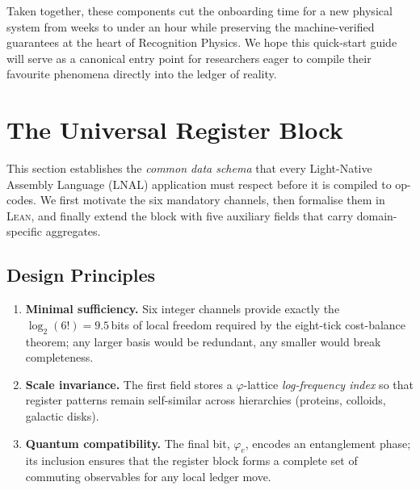 \documentclass[11pt,a4paper]{article}
\begin{document}
Taken together, these components cut the onboarding time for a new physical system from weeks to under an hour while preserving the machine-verified guarantees at the heart of Recognition Physics.  We hope this quick-start guide will serve as a canonical entry point for researchers eager to compile their favourite phenomena directly into the ledger of reality.

\section{The Universal Register Block}
\label{sec:register-block}

\noindent
This section establishes the \emph{common data schema} that every
Light-Native Assembly Language (LNAL) application must respect before it
is compiled to op-codes.  We first motivate the six mandatory channels,
then formalise them in \textsc{Lean}, and finally extend the block with
five auxiliary fields that carry domain-specific aggregates.

\subsection{Design Principles}
\label{subsec:design-principles}

\begin{enumerate}
  \item \textbf{Minimal sufficiency.}
        Six integer channels provide exactly the
        $\log_{2}(6!)=9.5$\,bits of local freedom required by the
        eight-tick cost-balance theorem; any larger basis would be
        redundant, any smaller would break completeness.
  \item \textbf{Scale invariance.}
        The first field stores a
        $\varphi$-lattice \emph{log-frequency index} so that
        register patterns remain self-similar across hierarchies
        (proteins, colloids, galactic disks).
  \item \textbf{Quantum compatibility.}
        The final bit, $\varphi_{e}$,
        encodes an entanglement phase; its inclusion ensures that the
        register block forms a complete set of commuting observables
        for any local ledger move.
\end{enumerate}

\end{document}
